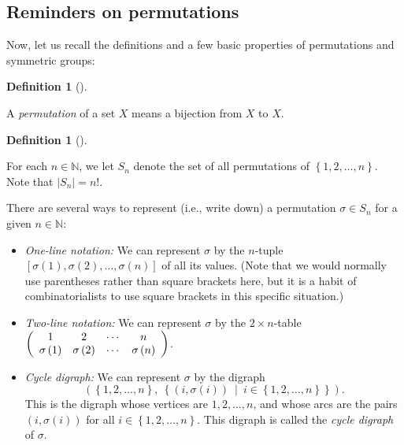 \documentclass[numbers=enddot,12pt,final,onecolumn,notitlepage]{scrartcl}%
\numberwithin{exer}{subsection}
\theoremstyle{definition}
\newtheorem{defi}[theo]{Definition}
\newenvironment{definition}[1][]
{\begin{defi}[#1]\begin{leftbar}}
{\end{leftbar}\end{defi}}
\begin{document}
\subsection{Reminders on permutations}

Now, let us recall the definitions and a few basic properties of permutations
and symmetric groups:

\begin{definition}
A \emph{permutation} of a set $X$ means a bijection from $X$ to $X$.
\end{definition}

\begin{definition}
For each $n\in\mathbb{N}$, we let $S_{n}$ denote the set of all permutations
of $\left\{  1,2,\ldots,n\right\}  $. Note that $\left\vert S_{n}\right\vert
=n!$.
\end{definition}

There are several ways to represent (i.e., write down) a permutation
$\sigma\in S_{n}$ for a given $n\in\mathbb{N}$:

\begin{itemize}
\item \emph{One-line notation:} We can represent $\sigma$ by the $n$-tuple
$\left[  \sigma\left(  1\right)  ,\sigma\left(  2\right)  ,\ldots
,\sigma\left(  n\right)  \right]  $ of all its values. (Note that we would
normally use parentheses rather than square brackets here, but it is a habit
of combinatorialists to use square brackets in this specific situation.)

\item \emph{Two-line notation:} We can represent $\sigma$ by the $2\times
n$-table $\left(
\begin{array}
[c]{cccc}%
1 & 2 & \cdots & n\\
\sigma\left(  1\right)  & \sigma\left(  2\right)  & \cdots & \sigma\left(
n\right)
\end{array}
\right)  $.

\item \emph{Cycle digraph:} We can represent $\sigma$ by the digraph%
\[
\left(  \left\{  1,2,\ldots,n\right\}  ,\ \left\{  \left(  i,\sigma\left(
i\right)  \right)  \ \mid\ i\in\left\{  1,2,\ldots,n\right\}  \right\}
\right)  .
\]
This is the digraph whose vertices are $1,2,\ldots,n$, and whose arcs are the
pairs $\left(  i,\sigma\left(  i\right)  \right)  $ for all $i\in\left\{
1,2,\ldots,n\right\}  $. This digraph is called the \emph{cycle digraph} of
$\sigma$.
\end{itemize}
\end{document}
